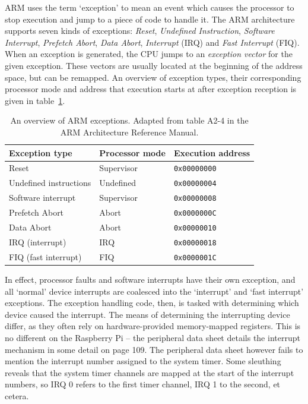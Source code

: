 \documentclass[twoside]{uva-inf-bachelor-thesis}
\begin{document}
ARM uses the term `exception' to mean an event which causes the processor to stop execution and jump to a piece of code to handle it. The ARM architecture supports seven kinds of exceptions: \textit{Reset}, \textit{Undefined Instruction}, \textit{Software Interrupt}, \textit{Prefetch Abort}, \textit{Data Abort}, \textit{Interrupt} (IRQ) and \textit{Fast Interrupt} (FIQ). When an exception is generated, the CPU jumps to an \textit{exception vector} for the given exception. These vectors are usually located at the beginning of the address space, but can be remapped. An overview of exception types, their corresponding processor mode and address that execution starts at after exception reception is given in table~\ref{tbl:exceptions}.

\begin{table}[h]
    \centering
    \begin{tabular}{lll}
        \toprule
        \textbf{Exception type} & \textbf{Processor mode} & \textbf{Execution address} \\
        \midrule
        Reset & Supervisor & \texttt{0x00000000} \\
        Undefined instructions & Undefined & \texttt{0x00000004} \\
        Software interrupt & Supervisor & \texttt{0x00000008} \\
        Prefetch Abort & Abort & \texttt{0x0000000C} \\
        Data Abort & Abort & \texttt{0x00000010} \\
        IRQ (interrupt) & IRQ & \texttt{0x00000018} \\
        FIQ (fast interrupt) & FIQ & \texttt{0x0000001C} \\
        \bottomrule
    \end{tabular}
    \caption{An overview of ARM exceptions. Adapted from table A2-4 in the ARM Architecture Reference Manual\cite{arm:arm}.}
    \label{tbl:exceptions}
\end{table}

In effect, processor faults and software interrupts have their own exception, and all `normal' device interrupts are coalesced into the `interrupt' and `fast interrupt' exceptions. The exception handling code, then, is tasked with determining which device caused the interrupt. The means of determining the interrupting device differ, as they often rely on hardware-provided memory-mapped registers. This is no different on the Raspberry Pi -- the peripheral data sheet details the interrupt mechanism in some detail on page 109. The peripheral data sheet however fails to mention the interrupt number assigned to the system timer. Some sleuthing reveals that the system timer channels are mapped at the start of the interrupt numbers, so IRQ 0 refers to the first timer channel, IRQ 1 to the second, et cetera.
\end{document}
